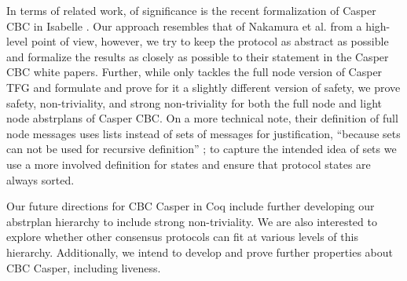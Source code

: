 In terms of related work, of significance is the recent formalization of Casper CBC in Isabelle \cite{Nakamura}.
Our approach resembles that of Nakamura et al. from a high-level point of view, however, we try to keep the protocol as abstract as possible and formalize the results as closely as possible to their statement in the Casper CBC white papers.
Further, while \cite{Nakamura} only tackles the full node version of Casper TFG and formulate and prove for it a slightly different version of safety, we prove safety, non-triviality, and strong non-triviality for both the full node and light node abstrplans of Casper CBC.
On a more technical note, their definition of full node messages uses lists instead of sets of messages for justification, ``because sets can not be used for recursive definition'' \cite{Nakamura-github}; to capture the intended idea of sets we use a more involved definition for states and ensure that protocol states are always sorted.

Our future directions for CBC Casper in Coq include further developing our abstrplan hierarchy to include strong non-triviality. We are also interested to explore whether other consensus protocols can fit at various levels of this hierarchy. Additionally, we intend to develop and prove further properties about CBC Casper, including liveness.